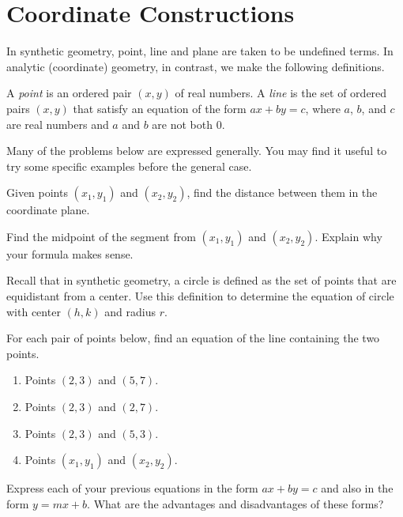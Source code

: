 \newpage
\section{Coordinate Constructions}
In synthetic geometry, point, line and plane are taken to be undefined terms.  In analytic (coordinate) geometry, in contrast, we make the following definitions.  
\begin{definition}
A \emph{point} is an ordered pair $(x,y)$ of real numbers. A \emph{line} is the set of ordered pairs $(x,y)$ that satisfy an equation of the form $ax + by = c$, where $a$, $b$, and $c$ are real numbers and $a$ and $b$ are not both 0.   
\end{definition}

Many of the problems below are expressed generally.  You may find it useful to try some specific examples before the general case.  

\begin{prob}
Given points $(x_1, y_1)$ and $(x_2, y_2)$, find the distance between them in the coordinate plane.
\end{prob}

\begin{prob}
Find the midpoint of the segment from $(x_1, y_1)$ and $(x_2, y_2)$.  Explain why your formula makes sense. 
\end{prob}

\begin{prob}
Recall that in synthetic geometry, a circle is defined as the set of points that are equidistant from a center.  Use this definition to determine the equation of circle with center $(h, k)$ and radius $r$.  
\end{prob}

\begin{prob}
For each pair of points below, find an equation of the line containing the two points.  
\begin{enumerate}
\item Points $(2,3)$ and $(5,7)$.  
\item Points $(2,3)$ and $(2,7)$.  
\item Points $(2,3)$ and $(5,3)$. 
\item Points $(x_1, y_1)$ and $(x_2, y_2)$.  
\end{enumerate}
\end{prob}

\begin{prob}
Express each of your previous equations in the form $ax + by = c$ and also in the form $y = mx + b$.   What are the advantages and disadvantages of these forms?  
\end{prob}

